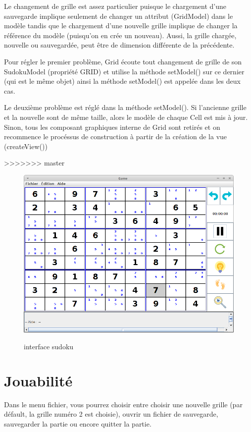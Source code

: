 Le changement de grille est assez particulier puisque le chargement d'une sauvegarde
implique seulement de changer un attribut (GridModel) dans le modèle tandis que 
le chargement d'une nouvelle grille implique de changer la référence du modèle
(puisqu'on en crée un nouveau). Aussi, la grille chargée, nouvelle ou sauvegardée,
peut être de dimension différente de la précédente.

Pour régler le premier problème, Grid écoute tout changement de grille de son
SudokuModel (propriété GRID) et utilise la méthode setModel() sur ce dernier
(qui est le même objet) ainsi la méthode setModel() est appelée dans les deux cas.

Le deuxième problème est réglé dans la méthode setModel(). Si l'ancienne grille
et la nouvelle sont de même taille, alors le modèle de chaque Cell est mis à jour.
Sinon, tous les composant graphiques interne de Grid sont retirés et on recommence
le procéssus de construction à partir de la création de la vue (createView())

>>>>>>> master

\begin{figure}[ht]
  \caption{\label{annexe6} interface sudoku}
  \includegraphics [width=130mm]{images/interface.png} \\[0.5cm]
\end{figure}

\newpage
\section{Jouabilité}
Dans le menu fichier, vous pourrez choisir entre choisir 
une nouvelle grille (par défault, la grille numéro 2 est choisie),
ouvrir un fichier de sauvegarde, 
sauvegarder la partie ou encore quitter la partie.

